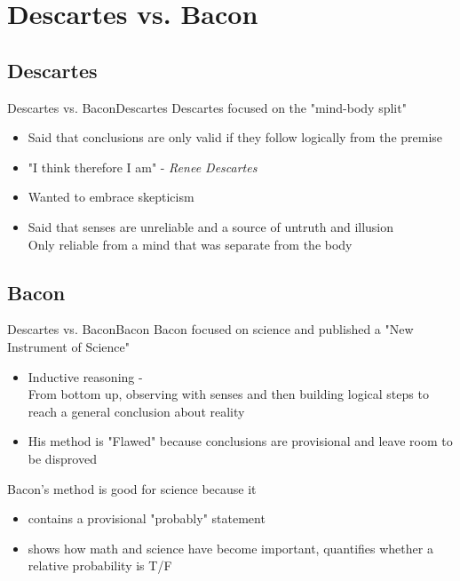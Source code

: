 \section{Descartes vs. Bacon}
\subsection{Descartes}
\begin{frame}{Descartes vs. Bacon}{Descartes}
	Descartes focused on the "mind-body split"
	\begin{itemize}
		\item Said that conclusions are only valid if they follow logically from the premise
		\item "I think therefore I am" - \textit{Renee Descartes}
		\item Wanted to embrace skepticism
		\item Said that senses are unreliable and a source of untruth and illusion\\
			Only reliable from a mind that was separate from the body
	\end{itemize}
\end{frame}

\subsection{Bacon}
\begin{frame}{Descartes vs. Bacon}{Bacon}
	Bacon focused on science and published a "New Instrument of Science"
	\begin{itemize}
		\item Inductive reasoning -\\
			From bottom up, observing with senses and then building logical steps to reach a general conclusion about reality
		\item His method is "Flawed" because conclusions are provisional and leave room to be disproved
	\end{itemize}
	Bacon's method is good for science because it
	\begin{itemize}
		\item contains a provisional "probably" statement
		\item shows how math and science have become important, quantifies whether a relative probability is T/F
	\end{itemize}
\end{frame}
